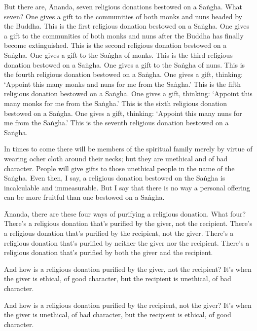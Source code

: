 \documentclass[12pt,openany]{book}%
\begin{document}
But there are, Ānanda, seven religious donations bestowed on a \textsanskrit{Saṅgha}. What seven? One gives a gift to the communities of both monks and nuns headed by the Buddha. This is the first religious donation bestowed on a \textsanskrit{Saṅgha}. One gives a gift to the communities of both monks and nuns after the Buddha has finally become extinguished. This is the second religious donation bestowed on a \textsanskrit{Saṅgha}. One gives a gift to the \textsanskrit{Saṅgha} of monks. This is the third religious donation bestowed on a \textsanskrit{Saṅgha}. One gives a gift to the \textsanskrit{Saṅgha} of nuns. This is the fourth religious donation bestowed on a \textsanskrit{Saṅgha}. One gives a gift, thinking: ‘Appoint this many monks and nuns for me from the \textsanskrit{Saṅgha}.’ This is the fifth religious donation bestowed on a \textsanskrit{Saṅgha}. One gives a gift, thinking: ‘Appoint this many monks for me from the \textsanskrit{Saṅgha}.’ This is the sixth religious donation bestowed on a \textsanskrit{Saṅgha}. One gives a gift, thinking: ‘Appoint this many nuns for me from the \textsanskrit{Saṅgha}.’ This is the seventh religious donation bestowed on a \textsanskrit{Saṅgha}. 

In times to come there will be members of the spiritual family merely by virtue of wearing ocher cloth around their necks; but they are unethical and of bad character. People will give gifts to those unethical people in the name of the \textsanskrit{Saṅgha}. Even then, I say, a religious donation bestowed on the \textsanskrit{Saṅgha} is incalculable and immeasurable. But I say that there is no way a personal offering can be more fruitful than one bestowed on a \textsanskrit{Saṅgha}. 

Ānanda, there are these four ways of purifying a religious donation. What four? There’s a religious donation that’s purified by the giver, not the recipient. There’s a religious donation that’s purified by the recipient, not the giver. There’s a religious donation that’s purified by neither the giver nor the recipient. There’s a religious donation that’s purified by both the giver and the recipient. 

And how is a religious donation purified by the giver, not the recipient? It’s when the giver is ethical, of good character, but the recipient is unethical, of bad character. 

And how is a religious donation purified by the recipient, not the giver? It’s when the giver is unethical, of bad character, but the recipient is ethical, of good character. 
\end{document}
